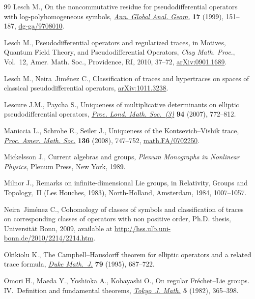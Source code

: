 \documentclass[pdftex]{sigma}
\begin{document}
\begin{thebibliography}{99}
Lesch M., On the noncommutative residue for pseudodif\/ferential operators with
  log-polyhomogeneous symbols, \href{http://dx.doi.org/10.1023/A:1006504318696}{\textit{Ann. Global Anal. Geom.}} \textbf{17}
  (1999), 151--187, \href{http://arxiv.org/abs/dg-ga/9708010}{dg-ga/9708010}.

Lesch M., Pseudodif\/ferential operators and regularized traces, in Motives,
  Quantum Field Theory, and Pseudodif\/ferential Operators, \textit{Clay Math.
  Proc.}, Vol.~12, Amer. Math. Soc., Providence, RI, 2010, 37--72,
  \href{http://arxiv.org/abs/0901.1689}{arXiv:0901.1689}.

Lesch M., Neira~Jim{\'e}nez C., Classif\/ication of traces and hypertraces on
  spaces of classical pseudodif\/ferential operators, \href{http://arxiv.org/abs/1011.3238}{arXiv:1011.3238}.

Lescure J.M., Paycha S., Uniqueness of multiplicative determinants on elliptic
  pseudodif\/ferential operators, \href{http://dx.doi.org/10.1112/plms/pdm004}{\textit{Proc. Lond. Math. Soc.~(3)}} \textbf{94}
  (2007), 772--812.

Maniccia L., Schrohe E., Seiler J., Uniqueness of the {K}ontsevich--{V}ishik
  trace, \href{http://dx.doi.org/10.1090/S0002-9939-07-09168-X}{\textit{Proc. Amer. Math. Soc.}} \textbf{136} (2008), 747--752,
  \href{http://arxiv.org/abs/math.FA/0702250}{math.FA/0702250}.

Mickelsson J., Current algebras and groups, \textit{Plenum Monographs in Nonlinear
  Physics}, Plenum Press, New York, 1989.

Milnor J., Remarks on inf\/inite-dimensional {L}ie groups, in Relativity, Groups
  and Topology,~{II} ({L}es {H}ouches, 1983), North-Holland, Amsterdam, 1984,
  1007--1057.

Neira~Jim{\'e}nez C., Cohomology of classes of symbols and classif\/ication of
  traces on correspon\-ding classes of operators with non positive order, Ph.D.
  thesis, Universit\"at Bonn, 2009, available at
  \url{http://hss.ulb.uni-bonn.de/2010/2214/2214.htm}.

Okikiolu K., The {C}ampbell--{H}ausdorf\/f theorem for elliptic operators and a
  related trace formula, \href{http://dx.doi.org/10.1215/S0012-7094-95-07918-6}{\textit{Duke Math.~J.}} \textbf{79} (1995), 687--722.

Omori H., Maeda Y., Yoshioka A., Kobayashi O., On regular {F}r\'echet--{L}ie
  groups. {IV}.~{D}ef\/inition and fundamental theorems, \href{http://dx.doi.org/10.3836/tjm/1270214899}{\textit{Tokyo~J. Math.}}
  \textbf{5} (1982), 365--398.


\end{thebibliography}
\end{document}

